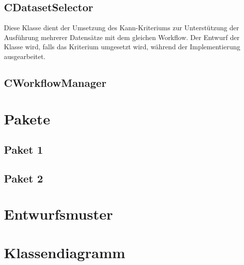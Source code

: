 \subsection{CDatasetSelector}
Diese Klasse dient der Umsetzung des Kann-Kriteriums zur Unterstützung der Ausführung mehrerer Datensätze mit dem gleichen Workflow. Der Entwurf der Klasse wird, falls das Kriterium umgesetzt wird, während der Implementierung ausgearbeitet.

\subsection{CWorkflowManager}
\beginMembers
{}
\closeMembers

\section{Pakete}
\subsection{Paket 1}
\subsection{Paket 2}
\section{Entwurfsmuster}

\section{Klassendiagramm}

